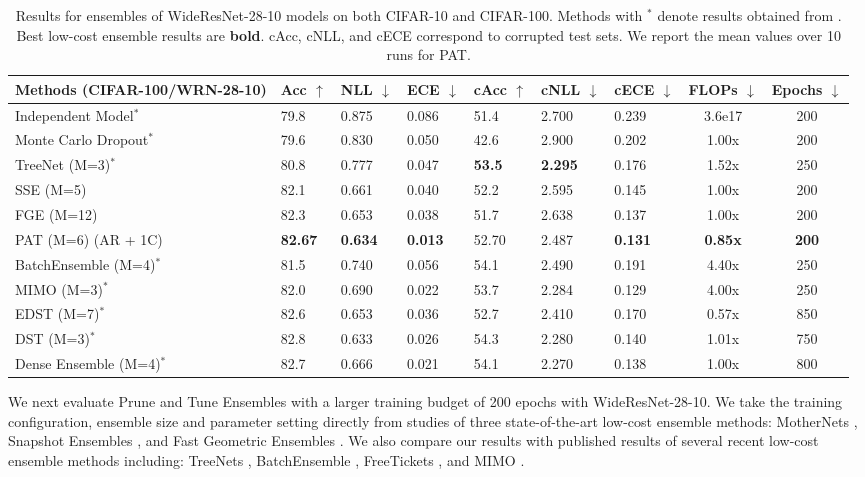 \documentclass[letterpaper]{article} %
\begin{document}
\begin{table}[t]
\begin{tabularx}{\textwidth}{X l l l l l l c c }
\toprule
Methods (CIFAR-100/WRN-28-10) & Acc $\uparrow$ & NLL $\downarrow$ & ECE $\downarrow$ & cAcc $\uparrow$ & cNLL $\downarrow$ & cECE $\downarrow$ & FLOPs $\downarrow$ & Epochs $\downarrow$ \\
\midrule
Independent Model$^*$ & 79.8 & 0.875 & 0.086 & 51.4 & 2.700 & 0.239 & 3.6e17 & 200 \\
Monte Carlo Dropout$^*$ & 79.6 & 0.830 & 0.050 & 42.6 & 2.900 & 0.202 & 1.00x & 200 \\
TreeNet (M=3)$^*$ & 80.8 & 0.777 & 0.047 & {\bf 53.5} & {\bf 2.295} & 0.176 & 1.52x & 250 \\
SSE (M=5) & 82.1 & 0.661 & 0.040 & 52.2 & 2.595 & 0.145 & 1.00x & 200 \\
FGE (M=12) & 82.3 & 0.653 & 0.038 & 51.7 & 2.638 & 0.137 & 1.00x & 200 \\
PAT (M=6) (AR + 1C) & {\bf 82.67} & {\bf 0.634} & {\bf 0.013} & 52.70 & 2.487 & {\bf 0.131} & {\bf 0.85x} & {\bf 200} \\
\midrule
BatchEnsemble (M=4)$^*$ & 81.5 & 0.740 & 0.056 & 54.1 & 2.490 & 0.191 & 4.40x & 250 \\
MIMO (M=3)$^*$ & 82.0 & 0.690 & 0.022 & 53.7 & 2.284 & 0.129 & 4.00x & 250 \\
EDST (M=7)$^*$ & 82.6 & 0.653 & 0.036 & 52.7 & 2.410 & 0.170 & 0.57x & 850 \\
DST (M=3)$^*$ & 82.8 & 0.633 & 0.026 & 54.3 & 2.280 & 0.140 & 1.01x & 750 \\
Dense Ensemble (M=4)$^*$ & 82.7 & 0.666 & 0.021 & 54.1 & 2.270 & 0.138 & 1.00x & 800 \\
\bottomrule
\end{tabularx}

\caption{Results for ensembles of WideResNet-28-10 models on both CIFAR-10 and CIFAR-100. Methods with $^*$ denote results obtained from \cite{havasi2021training, liu2021freetickets}. Best low-cost ensemble results are {\bf bold}. cAcc, cNLL, and cECE correspond to corrupted test sets. We report the mean values over 10 runs for PAT.}
\end{table}

We next evaluate Prune and Tune Ensembles with a larger training budget of 200 epochs with WideResNet-28-10. We take the training configuration, ensemble size and parameter setting directly from studies of three state-of-the-art low-cost ensemble methods: MotherNets \cite{wasay2020mothernets}, Snapshot Ensembles \cite{huang2017snapshot}, and Fast Geometric Ensembles \cite{garipov2018loss}. We also compare our results with published results of several recent low-cost ensemble methods including: TreeNets \cite{lee2015m}, BatchEnsemble \cite{wen2020batchensemble}, FreeTickets \cite{liu2021freetickets}, and MIMO \cite{havasi2021training}.
\end{document}
